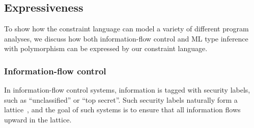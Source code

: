 \subsection{Expressiveness}


To show how the constraint language can model a variety of different
program analyses, we discuss how both information-flow control and ML
type inference with polymorphism can be expressed by our constraint
language.

\subsubsection{Information-flow control}


% 
% 
% 
% 

In information-flow control systems, information is tagged with security
labels, such as ``unclassified'' or ``top secret''. Such 
security labels naturally form a lattice~\cite{denning-lattice},
and the goal of such systems is to ensure that all information flows
upward in the lattice.

